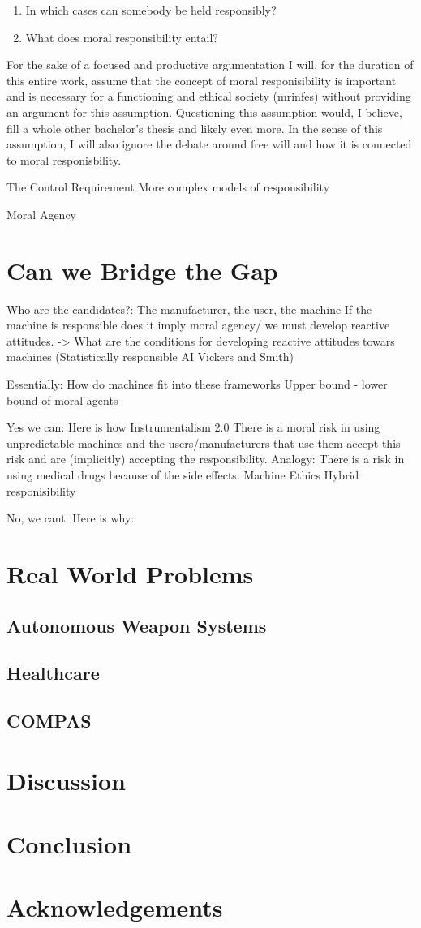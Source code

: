 \documentclass{article}
\begin{document}
\begin{enumerate}
	\item In which cases can somebody be held responsibly?
	\item What does moral responsibility entail?
\end{enumerate}
For the sake of a focused and productive argumentation I will, for the duration
of this entire work, assume that the concept of moral responisibility is
important and is necessary for a functioning and ethical society
(\acrshort{mrinfes}) without
providing an argument for this assumption. Questioning this assumption would, I
believe, fill a whole other bachelor's thesis and likely even more. In the sense of
this assumption, I will also ignore the debate around free will and how it is
connected to moral responisbility.

The Control Requirement
More complex models of responsibility

Moral Agency
\section{Can we Bridge the Gap}

Who are the candidates?: The manufacturer, the user, the machine
If the machine is responsible does it imply moral agency/ we must develop
reactive attitudes. -> What are the conditions for developing reactive attitudes
towars machines (Statistically responsible AI Vickers and Smith)

Essentially: How do machines fit into these frameworks
Upper bound - lower bound of moral agents

Yes we can: Here is how
Instrumentalism 2.0
	There is a moral risk in using unpredictable machines and the
	users/manufacturers that use them accept this risk and are (implicitly)
	accepting the responsibility. Analogy: There is a risk in using medical
	drugs because of the side effects.
Machine Ethics
Hybrid responisibility

No, we cant: Here is why:

\section{Real World Problems}
\subsection{Autonomous Weapon Systems}
\subsection{Healthcare}
\subsection{COMPAS}
\section{Discussion}
\section{Conclusion}
\section{Acknowledgements}
\clearpage

\printglossary[type=\acronymtype]
\printglossary
\printbibliography
\end{document}
